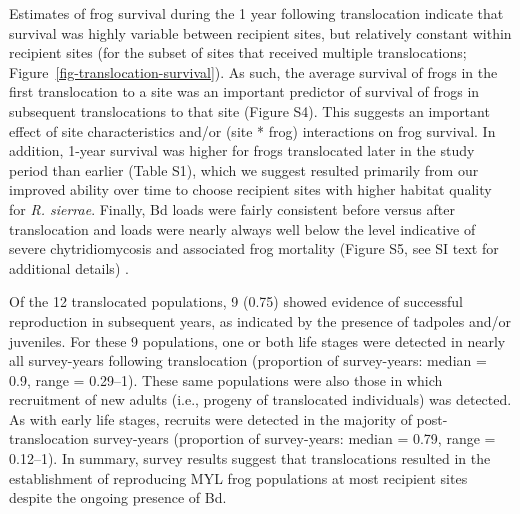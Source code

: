 \documentclass[9pt,twocolumn,twoside,lineno]{pnas-new}
\begin{document}
Estimates of frog survival during the 1 year following translocation
indicate that survival was highly variable between recipient sites, but
relatively constant within recipient sites (for the subset of sites that
received multiple translocations;
Figure~\ref{fig-translocation-survival}). As such, the average survival
of frogs in the first translocation to a site was an important predictor
of survival of frogs in subsequent translocations to that site
(Figure S4). This suggests an important
effect of site characteristics and/or (site * frog) interactions on frog
survival. In addition, 1-year survival was higher for frogs translocated
later in the study period than earlier
(Table S1), which we suggest resulted
primarily from our improved ability over time to choose recipient sites
with higher habitat quality for \emph{R. sierrae}. Finally, Bd loads
were fairly consistent before versus after translocation and loads were
nearly always well below the level indicative of severe chytridiomycosis
and associated frog mortality (Figure S5,
see SI text for additional details) \citep{joseph2018, vredenburg2010}.

Of the 12 translocated populations, 9 (0.75) showed evidence of
successful reproduction in subsequent years, as indicated by the
presence of tadpoles and/or juveniles. For these 9 populations, one or
both life stages were detected in nearly all survey-years following
translocation (proportion of survey-years: median = 0.9, range =
0.29--1). These same populations were also those in which recruitment of
new adults (i.e., progeny of translocated individuals) was detected. As
with early life stages, recruits were detected in the majority of
post-translocation survey-years (proportion of survey-years: median =
0.79, range = 0.12--1). In summary, survey results suggest that
translocations resulted in the establishment of reproducing MYL frog
populations at most recipient sites despite the ongoing presence of Bd.
\end{document}
